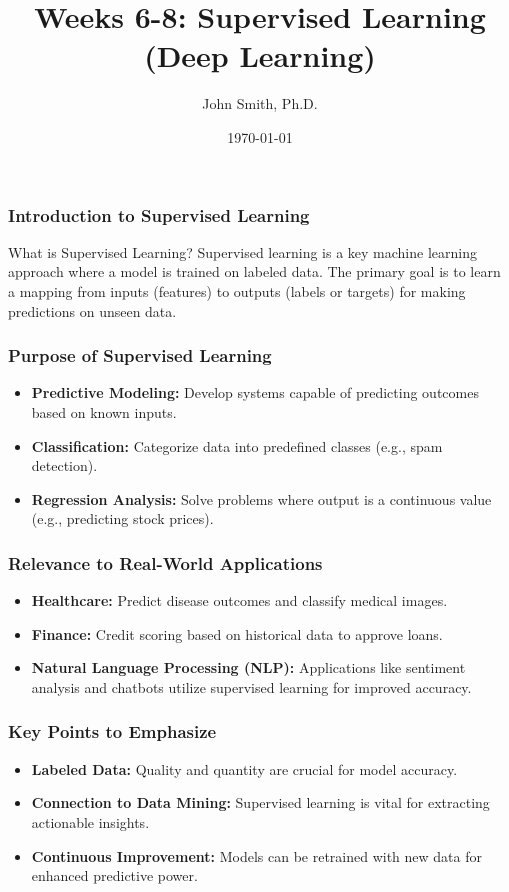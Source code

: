 \documentclass[aspectratio=169]{beamer}
\title[Supervised Learning]{Weeks 6-8: Supervised Learning (Deep Learning)}
\author[J. Smith]{John Smith, Ph.D.}
\institute[University Name]{
  Department of Computer Science\\
  University Name\\
  \vspace{0.3cm}
  Email: email@university.edu\\
  Website: www.university.edu
}
\date{\today}
\begin{document}
\frame{\titlepage}

\begin{frame}[fragile]
    \frametitle{Introduction to Supervised Learning}
    \begin{block}{What is Supervised Learning?}
        Supervised learning is a key machine learning approach where a model is trained on labeled data. The primary goal is to learn a mapping from inputs (features) to outputs (labels or targets) for making predictions on unseen data.
    \end{block}
\end{frame}

\begin{frame}[fragile]
    \frametitle{Purpose of Supervised Learning}
    \begin{itemize}
        \item \textbf{Predictive Modeling:} Develop systems capable of predicting outcomes based on known inputs.
        \item \textbf{Classification:} Categorize data into predefined classes (e.g., spam detection).
        \item \textbf{Regression Analysis:} Solve problems where output is a continuous value (e.g., predicting stock prices).
    \end{itemize}
\end{frame}

\begin{frame}[fragile]
    \frametitle{Relevance to Real-World Applications}
    \begin{itemize}
        \item \textbf{Healthcare:} Predict disease outcomes and classify medical images.
        \item \textbf{Finance:} Credit scoring based on historical data to approve loans.
        \item \textbf{Natural Language Processing (NLP):} Applications like sentiment analysis and chatbots utilize supervised learning for improved accuracy.
    \end{itemize}
\end{frame}

\begin{frame}[fragile]
    \frametitle{Key Points to Emphasize}
    \begin{itemize}
        \item \textbf{Labeled Data:} Quality and quantity are crucial for model accuracy.
        \item \textbf{Connection to Data Mining:} Supervised learning is vital for extracting actionable insights.
        \item \textbf{Continuous Improvement:} Models can be retrained with new data for enhanced predictive power.
    \end{itemize}
\end{frame}
\end{document}
